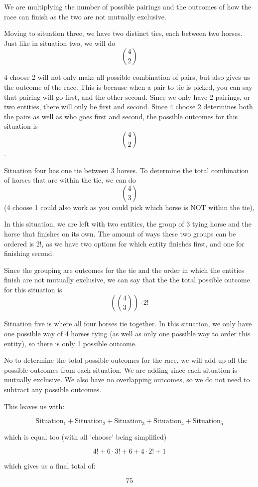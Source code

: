 \documentclass{article}
\begin{document}
We are multiplying the number of possible pairings and the outcomes of how the race can finish as the two are not mutually exclusive. 

Moving to situation three, we have two distinct ties, each between two horses. Just like in situation two, we will do \[
{4} \choose{2}
\]

4 choose 2 will not only make all possible combination of pairs, but also gives us the outcome of the race. This is because when a pair to tie is picked, you can say that pairing will go first, and the other second. Since we only have 2 pairings, or two entities, there will only be first and second. Since 4 choose 2 determines both the pairs as well as who goes first and second, the possible outcomes for this situation is \[
{4} \choose{2}
\].

Situation four has one tie between 3 horses. To determine the total combination of horses that are within the tie, we can do \[
{4} \choose{3}
\] (4 choose 1 could also work as you could pick which horse is NOT within the tie), 

In this situation, we are left with two entities, the group of 3 tying horse and the horse that finishes on its own. The amount of ways these two groups can be ordered is 2!, as we have two options for which entity finishes first, and one for finishing second. 

Since the grouping are outcomes for the tie and the order in which the entities finish are not mutually exclusive, we can say that the the total possible outcome for this situation is \[
\left(4\choose3\right) \cdot 2!
\]

Situation five is where all four horses tie together. In this situation, we only have one possible way of 4 horses tying (as well as only one possible way to order this entity), so there is only 1 possible outcome.

No to determine the total possible outcomes for the race, we will add up all the possible outcomes from each situation. We are adding since each situation is mutually exclusive. We also have no overlapping outcomes, so we do not need to subtract any possible outcomes.

This leaves us with: 

\[
\text{Situation}_{1} + \text{Situation}_{2} + \text{Situation}_{3} + \text{Situation}_{4} + \text{Situation}_{5}
\]

which is equal too (with all 'choose' being simplified)

\[4! + 6 \cdot 3! + 6 + 4 \cdot 2! + 1\]

which gives us a final total of:

\[75\]
\end{document}
